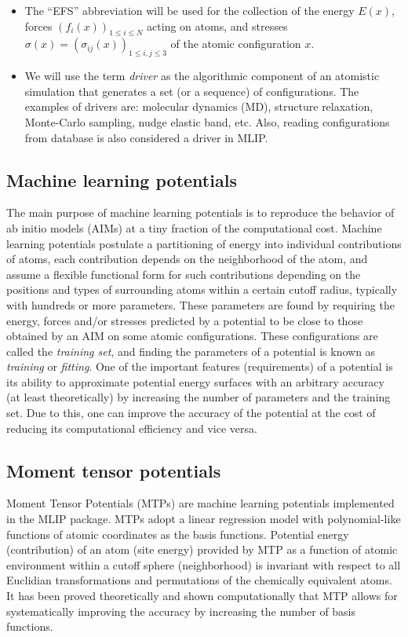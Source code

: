 \documentclass[12pt]{article}
\renewcommand{\_}{\char`_}
\begin{document}
\begin{itemize}
	\item The ``EFS'' abbreviation will be used for the collection of the energy $E(x)$, forces $(f_i(x))_{1\leq i\leq N}$ acting on atoms, and stresses $\sigma(x)=(\sigma_{ij}(x))_{1\leq i,j\leq 3}$ of the atomic configuration $x$.
	
	\item We will use the term \emph{driver} as the algorithmic component of an atomistic simulation that generates a set (or a sequence) of configurations.
	The examples of drivers are: molecular dynamics (MD), structure relaxation, Monte-Carlo sampling, nudge elastic band, etc.
	Also, reading configurations from database is also considered a driver in MLIP.
\end{itemize}

\subsection{Machine learning potentials}

The main purpose of machine learning potentials is to reproduce the behavior of ab initio models (AIMs) at a tiny fraction of the computational cost.
Machine learning potentials postulate a partitioning of energy into individual contributions of atoms, each contribution depends on the neighborhood of the atom, and assume a flexible functional form for such contributions depending on the positions and types of surrounding atoms within a certain cutoff radius, typically with hundreds or more parameters. These parameters are found by requiring the energy, forces and/or stresses predicted by a potential to be close to those obtained by an AIM on some atomic configurations. These configurations are called the \emph{training set}, and finding the parameters of a potential is known as \emph{training} or \emph{fitting}. One of the important features (requirements) of a potential is its ability to approximate potential energy surfaces with an arbitrary accuracy (at least theoretically) by increasing the number of parameters and the training set. Due to this, one can improve the accuracy of the potential at the cost of reducing its computational efficiency and vice versa.

\subsection{Moment tensor potentials}

Moment Tensor Potentials (MTPs) \cite{Shapeev2016-MTP} are machine learning potentials implemented in the MLIP package. MTPs adopt a linear regression model with polynomial-like functions of atomic coordinates as the basis functions.
Potential energy (contribution) of an atom (site energy) provided by MTP as a function of atomic environment within a cutoff sphere (neighborhood) is invariant with respect to all Euclidian transformations and permutations of the chemically equivalent atoms. It has been proved theoretically and shown computationally that MTP allows for systematically improving the accuracy by increasing the number of basis functions.
\end{document}
